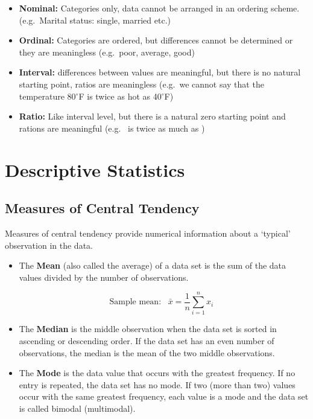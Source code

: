 \documentclass[
]{article}
\providecommand{\tightlist}{%
  \setlength{\itemsep}{0pt}\setlength{\parskip}{0pt}}
\begin{document}
\begin{itemize}
\item
  \textbf{Nominal:} Categories only, data cannot be arranged in an
  ordering scheme. (e.g.~Marital status: single, married etc.)
\item
  \textbf{Ordinal:} Categories are ordered, but differences cannot be
  determined or they are meaningless (e.g.~poor, average, good)
\item
  \textbf{Interval:} differences between values are meaningful, but
  there is no natural starting point, ratios are meaningless (e.g.~we
  cannot say that the temperature 80\(^{\circ}\)F is twice as hot as
  40\(^{\circ}\)F)
\item
  \textbf{Ratio:} Like interval level, but there is a natural zero
  starting point and rations are meaningful (e.g.~ is
  twice as much as )
\end{itemize}

\pagebreak

\hypertarget{descriptive-statistics}{%
\section{Descriptive Statistics}\label{descriptive-statistics}}

\hypertarget{measures-of-central-tendency}{%
\subsection{Measures of Central
Tendency}\label{measures-of-central-tendency}}

Measures of central tendency provide numerical information about a
`typical' observation in the data.

\begin{itemize}
\tightlist
\item
  The \textbf{Mean} (also called the average) of a data set is the sum
  of the data values divided by the number of observations.
\end{itemize}

\[\;\;\;\; \text{Sample mean:}\;\;\; \bar{x}=\frac{1}{n}\sum_{i=1}^{n}x_i\]

\begin{itemize}
\tightlist
\item
  The \textbf{Median} is the middle observation when the data set is
  sorted in ascending or descending order. If the data set has an even
  number of observations, the median is the mean of the two middle
  observations.
\item
  The \textbf{Mode} is the data value that occurs with the greatest
  frequency. If no entry is repeated, the data set has no mode. If two
  (more than two) values occur with the same greatest frequency, each
  value is a mode and the data set is called bimodal (multimodal).
\end{itemize}
\end{document}
